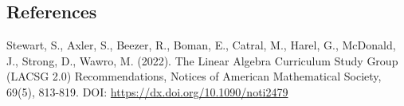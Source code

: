 \documentclass{ximera}
\begin{document}



\subsection*{References}

Stewart, S., Axler, S., Beezer, R., Boman, E., Catral, M., Harel, G., McDonald, J., Strong, D., Wawro, M. (2022). The Linear Algebra Curriculum Study Group (LACSG 2.0) Recommendations, Notices of American Mathematical Society, 69(5), 813-819. DOI: \href{https://dx.doi.org/10.1090/noti2479}{https://dx.doi.org/10.1090/noti2479}
\end{document}
